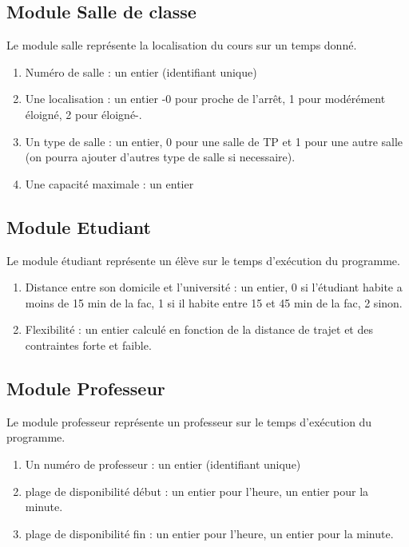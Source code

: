 \documentclass[a4paper,11pt]{article}
\begin{document}
	\subsection{Module Salle de classe}
		Le module salle représente la localisation du cours sur un temps donné.
		\begin{enumerate}
			\item Numéro de salle : un entier (identifiant unique)
			\item Une localisation : un entier -0 pour proche de l'arrêt, 1 pour modérément éloigné, 2 pour éloigné-. 
			\item Un type de salle : un entier, 0 pour une salle de TP et 1 pour une autre salle (on pourra ajouter d'autres type de salle si necessaire).
			\item Une capacité maximale : un entier
		\end{enumerate}
	\subsection{Module Etudiant}
		Le module étudiant représente un élève sur le temps d'exécution du programme.
		\begin{enumerate}
			\item Distance entre son domicile et l'université : un entier, 0 si l'étudiant habite a moins de 15 min de la fac, 1 si il habite entre 15 et 45 min de la fac, 2 sinon.
			\item Flexibilité : un entier calculé en fonction de la distance de trajet et des contraintes forte et faible. 
			\end{enumerate}
	\subsection{Module Professeur}
		Le module professeur représente un professeur sur le temps d'exécution du programme.
		\begin{enumerate}
			\item Un numéro de professeur : un entier (identifiant unique)
			\item plage de disponibilité début : un entier pour l'heure, un entier pour la minute.
			\item plage de disponibilité fin : un entier pour l'heure, un entier pour la minute.
			\end{enumerate}
\end{document}
